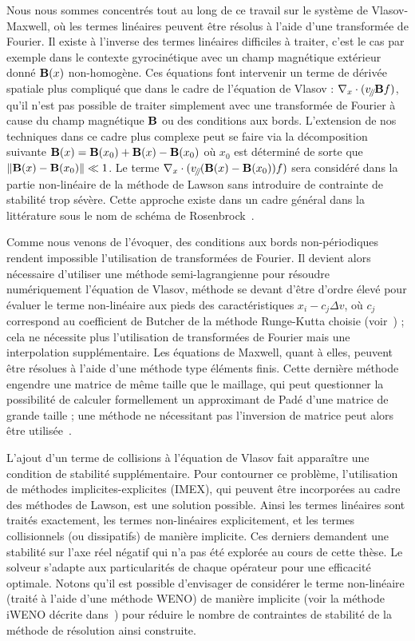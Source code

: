 Nous nous sommes concentrés tout au long de ce travail sur le système de Vlasov-Maxwell, où les termes linéaires peuvent être résolus à l'aide d'une transformée de Fourier. Il existe à l'inverse des termes linéaires difficiles à traiter, c'est le cas par exemple dans le contexte gyrocinétique avec un champ magnétique extérieur donné $\vb{B}(x)$ non-homogène. Ces équations font intervenir un terme de dérivée spatiale plus compliqué que dans le cadre de l'équation de Vlasov : $\nabla_{x}\cdot(v_{\mathbin{\!/\mkern-5mu/\!}}\vb{B}f)$, qu'il n'est pas possible de traiter simplement avec une transformée de Fourier à cause du champ magnétique $\vb{B}$ ou des conditions aux bords. L'extension de nos techniques dans ce cadre plus complexe peut se faire via la décomposition suivante $\vb{B}(x)=\vb{B}(x_0)+\vb{B}(x)-\vb{B}(x_0)$ où $x_0$ est déterminé de sorte que $\|\vb{B}(x)-\vb{B}(x_0)\| \ll 1$. Le terme $\nabla_x\cdot (v_{\mathbin{\!/\mkern-5mu/\!}} (\vb{B}(x)-\vb{B}(x_0))f)$ sera considéré dans la partie non-linéaire de la méthode de Lawson sans introduire de contrainte de stabilité trop sévère. Cette approche existe dans un cadre général dans la littérature sous le nom de schéma de Rosenbrock~\cite{Hochbruck:2006,Hochbruck:2009,Luan:2016}.


Comme nous venons de l'évoquer, des conditions aux bords non-périodiques rendent impossible l'utilisation de transformées de Fourier. Il devient alors nécessaire d'utiliser une méthode semi-lagrangienne pour résoudre numériquement l'équation de Vlasov, méthode se devant d'être d'ordre élevé pour évaluer le terme non-linéaire aux pieds des caractéristiques $x_i - c_j\Delta v$, où $c_j$ correspond au coefficient de Butcher de la méthode Runge-Kutta choisie (voir~\cite{Boscarino:2019a}) ; cela ne nécessite plus l'utilisation de transformées de Fourier mais une interpolation supplémentaire. Les équations de Maxwell, quant à elles, peuvent être résolues à l'aide d'une méthode type éléments finis. Cette dernière méthode engendre une matrice de même taille que le maillage, qui peut questionner la possibilité de calculer formellement un approximant de Padé d'une matrice de grande taille ; une méthode ne nécessitant pas l'inversion de matrice peut alors être utilisée~\cite{Li:2011}.

L'ajout d'un terme de collisions à l'équation de Vlasov fait apparaître une condition de stabilité supplémentaire. Pour contourner ce problème, l'utilisation de méthodes implicites-explicites (IMEX), qui peuvent être incorporées au cadre des méthodes de Lawson, est une solution possible. Ainsi les termes linéaires sont traités exactement, les termes non-linéaires explicitement, et les termes collisionnels (ou dissipatifs) de manière implicite. Ces derniers demandent une stabilité sur l'axe réel négatif qui n'a pas été explorée au cours de cette thèse. Le solveur s'adapte aux particularités de chaque opérateur pour une efficacité optimale. Notons qu'il est possible d'envisager de considérer le terme non-linéaire (traité à l'aide d'une méthode WENO) de manière implicite (voir la méthode iWENO décrite dans~\cite{Gottlieb:2006}) pour réduire le nombre de contraintes de stabilité de la méthode de résolution ainsi construite.


